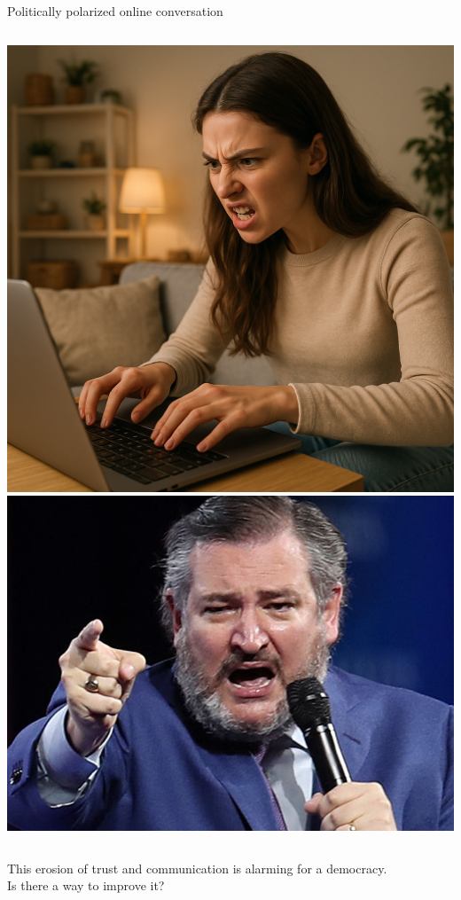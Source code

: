 \documentclass[12pt]{beamer}
\begin{document}
\begin{frame}[c]{Politically polarized online conversation}
\begin{columns}[c,onlytextwidth]
  \begin{column}{0.2\textwidth}
    \centering
    \includegraphics[width=\linewidth]{angryGirl.png} \\
    \bigskip
    \includegraphics[width=\linewidth]{cruz.jpg}
  \end{column}
\end{columns}

\vspace{-.1in}
\begin{center}
This erosion of trust and communication is alarming for a democracy.\\
\pause
\large Is there a way to improve it?
\end{center}

\end{frame}
\end{document}
